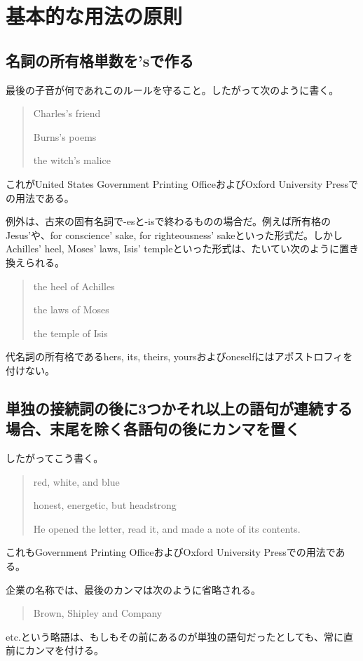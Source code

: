 \chapter{基本的な用法の原則}
\section{名詞の所有格単数を'sで作る}
最後の子音が何であれこのルールを守ること。したがって次のように書く。
\begin{quote}
Charles's friend

Burns's poems

the witch's malice    
\end{quote}
これがUnited States Government Printing OfficeおよびOxford University Pressでの用法である。
\par
例外は、古来の固有名詞で-esと-isで終わるものの場合だ。例えば所有格のJesus'や、for
conscience' sake, for righteousness' sakeといった形式だ。しかしAchilles'
heel, Moses' laws, Isis'
templeといった形式は、たいてい次のように置き換えられる。
\begin{quote}
the heel of Achilles

the laws of Moses

the temple of Isis    
\end{quote}
代名詞の所有格であるhers, its, theirs, yoursおよびoneselfにはアポストロフィを付けない。
\section{単独の接続詞の後に3つかそれ以上の語句が連続する場合、末尾を除く各語句の後にカンマを置く}
したがってこう書く。
\begin{quote}
red, white, and blue

honest, energetic, but headstrong

He opened the letter, read it, and made a note of its contents.    
\end{quote}
これもGovernment Printing OfficeおよびOxford University
Pressでの用法である。
\par
企業の名称では、最後のカンマは次のように省略される。
\begin{quote}
Brown, Shipley and Company    
\end{quote}
etc.という略語は、もしもその前にあるのが単独の語句だったとしても、常に直前にカンマを付ける。
